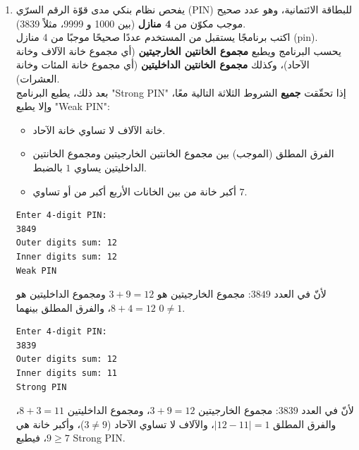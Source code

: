 \documentclass[14pt]{extarticle}
\begin{document}
\begin{enumerate}[resume, itemsep=2.2em]
\item
يفحص نظام بنكي مدى قوّة الرقم السرّي (\textenglish{PIN}) للبطاقة الائتمانية، وهو عدد صحيح موجب مكوّن من \textbf{4 منازل} (بين 1000 و 9999، مثلاً \textenglish{3839}). \\
اكتب برنامجًا يستقبل من المستخدم عددًا صحيحًا موجبًا من 4 منازل (\textenglish{pin}). \\
يحسب البرنامج ويطبع \textbf{مجموع الخانتين الخارجيتين} (أي مجموع خانة الآلاف وخانة الآحاد)، وكذلك \textbf{مجموع الخانتين الداخليتين} (أي مجموع خانة المئات وخانة العشرات). \\
بعد ذلك، يطبع البرنامج \textenglish{"Strong PIN"} إذا تحقّقت \textbf{جميع} الشروط الثلاثة التالية معًا، وإلا يطبع \textenglish{"Weak PIN"}:
\begin{itemize}[nosep]
    \item خانة الآلاف لا تساوي خانة الآحاد.
    \item الفرق المطلق (الموجب) بين مجموع الخانتين الخارجيتين ومجموع الخانتين الداخليتين يساوي $1$ بالضبط.
    \item أكبر خانة من بين الخانات الأربع أكبر من أو تساوي $7$.
\end{itemize}

\ifdetailed
\begin{boxExample}[1]
\begin{english}
\begin{verbatim}
Enter 4-digit PIN:
3849
Outer digits sum: 12
Inner digits sum: 12
Weak PIN
\end{verbatim}
\end{english}
\end{boxExample}
لأنّ في العدد $3849$: مجموع الخارجيتين هو $3 + 9 = 12$ ومجموع الداخليتين هو $8 + 4 = 12$، والفرق المطلق بينهما $0 \neq 1$.
\begin{boxExample}[2]
\begin{english}
\begin{verbatim}
Enter 4-digit PIN:
3839
Outer digits sum: 12
Inner digits sum: 11
Strong PIN
\end{verbatim}
\end{english}
\end{boxExample}
لأنّ في العدد $3839$: مجموع الخارجيتين $3 + 9 = 12$، ومجموع الداخليتين $8 + 3 = 11$، والفرق المطلق $|12 - 11| = 1$، والآلاف لا تساوي الآحاد ($3 \neq 9$)، وأكبر خانة هي $9 \ge 7$، فيطبع \textenglish{Strong PIN}.
\fi


\end{enumerate}
\end{document}
